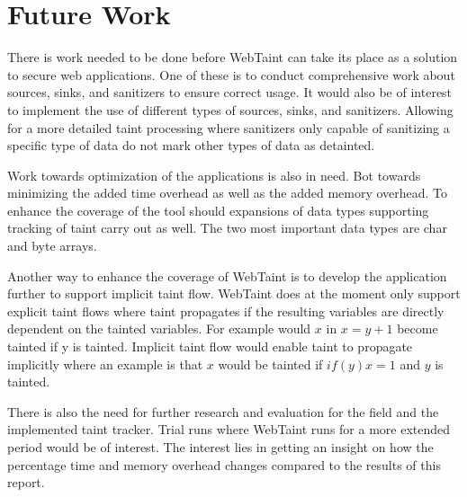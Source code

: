 \chapter{Future Work}
\label{FutureWork}
There is work needed to be done before WebTaint can take its place as a solution to secure web applications. One of these is to conduct comprehensive work about sources, sinks, and sanitizers to ensure correct usage. It would also be of interest to implement the use of different types of sources, sinks, and sanitizers. Allowing for a more detailed taint processing where sanitizers only capable of sanitizing a specific type of data do not mark other types of data as detainted. 

Work towards optimization of the applications is also in need. Bot towards minimizing the added time overhead as well as the added memory overhead. To enhance the coverage of the tool should expansions of data types supporting tracking of taint carry out as well. The two most important data types are char and byte arrays. 

Another way to enhance the coverage of WebTaint is to develop the application further to support implicit taint flow. WebTaint does at the moment only support explicit taint flows where taint propagates if the resulting variables are directly dependent on the tainted variables. For example would $ x $ in $ x = y + 1 $ become tainted if y is tainted. Implicit taint flow would enable taint to propagate implicitly where an example is that $ x $ would be tainted if $ if (y) x = 1 $ and $ y $ is tainted.

There is also the need for further research and evaluation for the field and the implemented taint tracker. Trial runs where WebTaint runs for a more extended period would be of interest. The interest lies in getting an insight on how the percentage time and memory overhead changes compared to the results of this report.